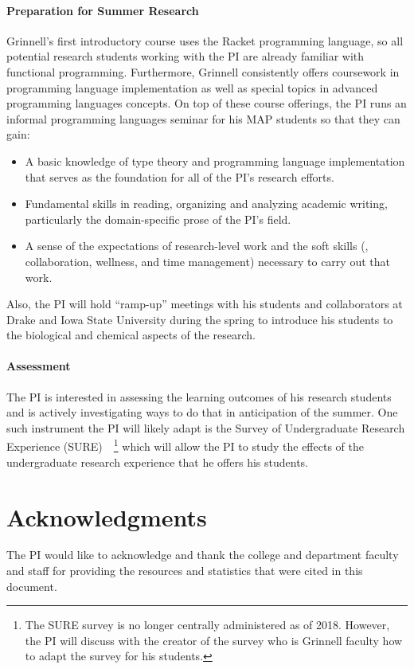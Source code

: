 \documentclass[11pt]{article}
\begin{document}
\paragraph{Preparation for Summer Research}

Grinnell's first introductory course uses the Racket programming language, so all potential research students working with the PI are already familiar with functional programming.
Furthermore, Grinnell consistently offers coursework in programming language implementation as well as special topics in advanced programming languages concepts.
On top of these course offerings, the PI runs an informal programming languages seminar for his MAP students so that they can gain:
\begin{itemize}[itemsep=0pt]
  \item A basic knowledge of type theory and programming language implementation that serves as the foundation for all of the PI's research efforts.
  \item Fundamental skills in reading, organizing and analyzing academic writing, particularly the domain-specific prose of the PI's field.
  \item A sense of the expectations of research-level work and the soft skills (\eg, collaboration, wellness, and time management) necessary to carry out that work.
\end{itemize}
Also, the PI will hold ``ramp-up'' meetings with his students and collaborators at Drake and Iowa State University during the spring to introduce his students to the biological and chemical aspects of the research.

\paragraph{Assessment}
The PI is interested in assessing the learning outcomes of his research students and is actively investigating ways to do that in anticipation of the summer.
One such instrument the PI will likely adapt is the Survey of Undergraduate Research Experience (SURE)~\cite{lopatto:tcp:2008}~\footnote{%
  The SURE survey is no longer centrally administered as of 2018.
  However, the PI will discuss with the creator of the survey who is Grinnell faculty how to adapt the survey for his students.
} which will allow the PI to study the effects of the undergraduate research experience that he offers his students.

\section{Acknowledgments}
The PI would like to acknowledge and thank the college and department faculty and staff for providing the resources and statistics that were cited in this document.

\newpage



\end{document}
